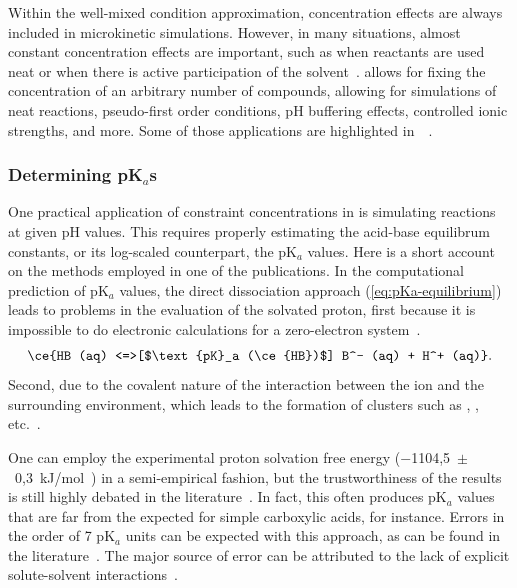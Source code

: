 Within the well-mixed condition approximation,
concentration effects are always included in microkinetic simulations.
However,
in many situations,
almost constant concentration effects are important,
such as when reactants are used neat or when there is active participation of the solvent~\cite{Ryu_2018}.
\overreact allows for fixing the concentration of an arbitrary number of compounds,
allowing for simulations of neat reactions,
pseudo-first order conditions,
pH buffering effects,
controlled ionic strengths,
and more.
Some of those applications are highlighted in~\citeauthor{Schneider_2022}~\cite{Schneider_2022}.

\subsubsection{Determining pK$_a$s}%
\label{sec:pka}

One practical application of constraint concentrations in \overreact{} is simulating reactions at given pH values.
This requires properly estimating the acid-base equilibrum constants, or its log-scaled counterpart, the pK$_a$ values.
Here is a short account on the methods employed in one of the publications. %
In the computational prediction of pK$_a$ values,
the direct dissociation approach (\cref{eq:pKa-equilibrium})
leads to problems in the evaluation of the solvated proton,
first because it is impossible to do electronic calculations for a zero-electron
system~\cite{Ding_2009,Sumon_2012}.
%
\begin{equation}
	\ce{HB (aq) <=>[$\text{pK}_a (\ce{HB})$] B^- (aq) + H^+ (aq)}\text{.}
	\label{eq:pKa-equilibrium}
\end{equation}
%
Second,
due to the covalent nature of the interaction between the  ion
and the surrounding environment,
which leads to the formation of clusters such
as ,
,
etc.~\cite{Sumon_2012}.

One can employ the experimental proton solvation free energy
($-$1104,5~$\pm$~0,3~kJ/mol~\cite{Tissandier_1998,Marenich_2009}) in a
semi-empirical fashion,
but the trustworthiness of the results is still highly
debated in the literature~\cite{Yang_2013}.
In fact,
this often produces pK$_a$ values that are far from the expected
for simple carboxylic acids,
for instance.
Errors in the order of 7 pK$_a$ units can be expected with this approach,
as can be found in the literature~\cite{Pliego_2002,Ding_2009}.
The major source of error can be attributed to the lack of explicit
solute-solvent interactions~\cite{Pliego_2002}.

